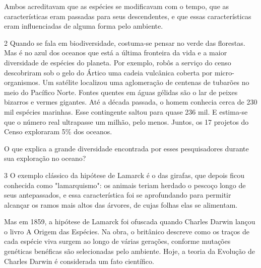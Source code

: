 {{\begin{escolha}
{Ambos acreditavam que as espécies se modificavam com o tempo, que as
características eram passadas para seus descendentes, e que essas
características eram influenciadas de alguma forma pelo ambiente.}
\end{escolha}

\num{2} Quando se fala em biodiversidade, costuma-se pensar no verde das florestas. Mas é no azul dos oceanos que está a última fronteira da vida e a maior diversidade de espécies do planeta. Por exemplo, robôs a serviço do censo descobriram sob o gelo do Ártico uma cadeia vulcânica coberta por micro-organismos. Um satélite localizou uma aglomeração de centenas de tubarões no meio do Pacífico Norte. Fontes quentes em águas gélidas são o lar de peixes bizarros e vermes gigantes. Até a década passada, o homem conhecia cerca de 230 mil espécies marinhas. Esse contingente saltou para quase 236 mil. E estima-se que o número real ultrapasse um milhão, pelo menos. Juntos, os 17 projetos do Censo exploraram 5\% dos oceanos.


O que explica a grande diversidade encontrada por esses pesquisadores
durante sua exploração no oceano?



\num{3}  O exemplo clássico da hipótese de Lamarck é o das girafas, que depois ficou conhecida como "lamarquismo": os animais teriam herdado o pescoço longo de seus antepassados, e essa característica foi se aprofundando para permitir alcançar os ramos mais altos das árvores, de cujas folhas elas se alimentam.

Mas em 1859, a hipótese de Lamarck foi ofuscada quando Charles Darwin
lançou o livro A Origem das Espécies. Na obra, o britânico descreve como
os traços de cada espécie viva surgem ao longo de várias gerações,
conforme mutações genéticas benéficas são selecionadas pelo ambiente.
Hoje, a teoria da Evolução de Charles Darwin é considerada um fato
científico.


}}
